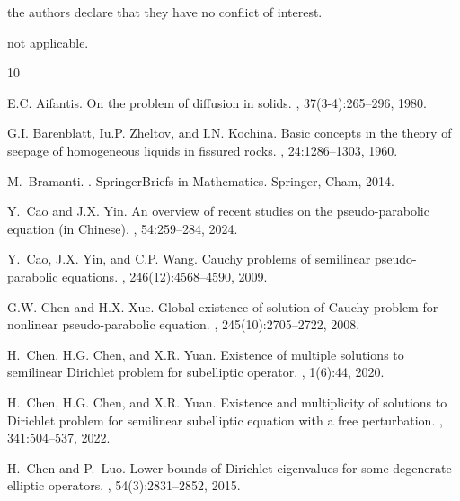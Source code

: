 \documentclass[11pt,a4paper]{article}
\numberwithin{equation}{section}
\numberwithin{remark}{section}
\begin{document}
 the authors declare that they have no conflict of interest.

 not applicable. 



%
%
\begin{thebibliography}{10}

E.C. Aifantis.
\newblock On the problem of diffusion in solids.
, 37(3-4):265--296, 1980.

G.I. Barenblatt, Iu.P. Zheltov, and I.N. Kochina.
\newblock Basic concepts in the theory of seepage of homogeneous liquids in
  fissured rocks.
, 24:1286--1303, 1960.

M.~Bramanti.
.
\newblock SpringerBriefs in Mathematics. Springer, Cham, 2014.

Y.~Cao and J.X. Yin.
\newblock An overview of recent studies on the pseudo-parabolic equation (in
  Chinese).
, 54:259--284, 2024.

Y.~Cao, J.X. Yin, and C.P. Wang.
\newblock Cauchy problems of semilinear pseudo-parabolic equations.
, 246(12):4568--4590, 2009.

G.W. Chen and H.X. Xue.
\newblock Global existence of solution of {C}auchy problem for nonlinear
  pseudo-parabolic equation.
, 245(10):2705--2722, 2008.

H.~Chen, H.G. Chen, and X.R. Yuan.
\newblock Existence of multiple solutions to semilinear {D}irichlet problem for
  subelliptic operator.
, 1(6):44, 2020.

H.~Chen, H.G. Chen, and X.R. Yuan.
\newblock Existence and multiplicity of solutions to {D}irichlet problem for
  semilinear subelliptic equation with a free perturbation.
, 341:504--537, 2022.

H.~Chen and P.~Luo.
\newblock Lower bounds of {D}irichlet eigenvalues for some degenerate elliptic
  operators.
, 54(3):2831--2852,
  2015.


\end{thebibliography}
\end{document}
